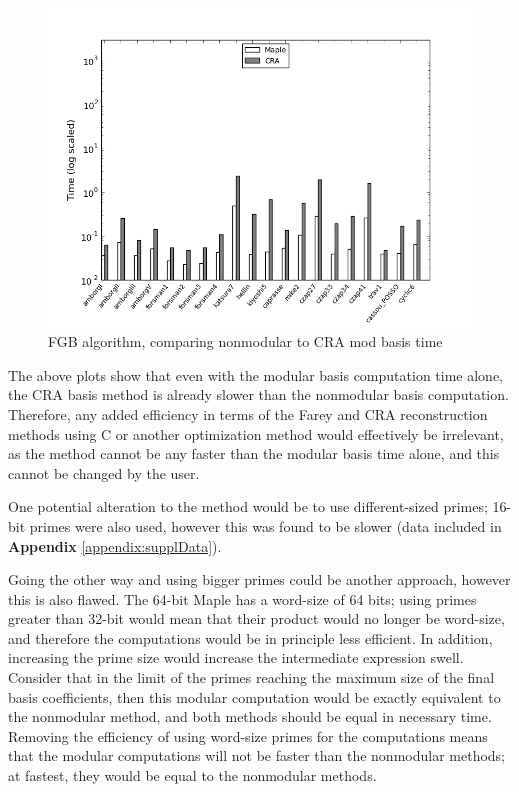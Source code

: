 \documentclass[letterpaper,12pt,titlepage,oneside,final]{book}
\begin{document}
\begin{figure}[H]
  \centering
  \includegraphics[scale=0.7]{fgb_mapleVsCRA_modBasisTime.png}
  \caption{FGB algorithm, comparing nonmodular to CRA mod basis time \label{fig:f4_tests}}
\end{figure}  

The above plots show that even with the modular basis computation time alone, the CRA basis method is already slower than the nonmodular basis computation.  Therefore, any added efficiency in terms of the Farey and CRA reconstruction methods using C or another optimization method would effectively be irrelevant, as the method cannot be any faster than the modular basis time alone, and this cannot be changed by the user.  

One potential alteration to the method would be to use different-sized primes; 16-bit primes were also used, however this was found to be slower (data included in \textbf{Appendix} \ref{appendix:supplData}).  

Going the other way and using bigger primes could be another approach, however this is also flawed.  The 64-bit Maple has a word-size of 64 bits; using primes greater than 32-bit would mean that their product would no longer be word-size, and therefore the computations would be in principle less efficient.  In addition, increasing the prime size would increase the intermediate expression swell.  Consider that in the limit of the primes reaching the maximum size of the final basis coefficients, then this modular computation would be exactly equivalent to the nonmodular method, and both methods should be equal in necessary time.  Removing the efficiency of using word-size primes for the computations means that the modular computations will not be faster than the nonmodular methods; at fastest, they would be equal to the nonmodular methods.  
\end{document}
